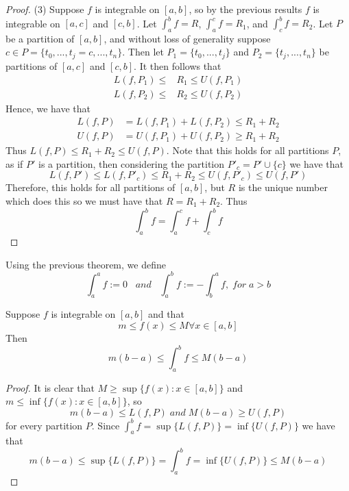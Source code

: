 \begin{proof}
    (3) Suppose $f$ is integrable on $[a,b]$, so by the previous results $f$ is integrable on $[a,c]$ and $[c,b]$. Let $\int_a^bf = R$, $\int_a^cf = R_1$, and $\int_c^bf = R_2$. Let $P$ be a partition of $[a,b]$, and without loss of generality suppose $c \in P = \{t_0,...,t_j = c,...,t_n\}$. Then let $P_1 = \{t_0,...,t_j\}$ and $P_2 = \{t_j,...,t_n\}$ be partitions of $[a,c]$ and $[c,b]$. It then follows that \begin{align*}
        L(f,P_1) \leq &R_1 \leq U(f,P_1) \\
        L(f,P_2) \leq &R_2 \leq U(f,P_2)
    \end{align*}
    Hence, we have that \begin{align*}
        L(f,P) &= L(f,P_1) + L(f,P_2) \leq R_1 + R_2 \\
        U(f,P) &= U(f,P_1) + U(f,P_2) \geq R_1 + R_2
    \end{align*}
    Thus $L(f,P) \leq R_1 + R_2\leq U(f,P)$. Note that this holds for all partitions $P$, as if $P'$ is a partition, then considering the partition $P'_{c} = P' \cup \{c\}$ we have that $$L(f,P') \leq L(f,P'_{c}) \leq R_1 + R_2 \leq U(f,P'_{c}) \leq U(f,P')$$
    Therefore, this holds for all partitions of $[a,b]$, but $R$ is the unique number which does this so we must have that $R = R_1 + R_2$. Thus \begin{equation*}
        \int_a^bf = \int_a^cf + \int_c^bf
    \end{equation*}
\end{proof}


\begin{defn}
    Using the previous theorem, we define \begin{equation}
        \int_a^af := 0 \;\;\;and\;\;\;\int_a^bf := -\int_b^af,\;for\;a>b
    \end{equation}
\end{defn}


\begin{thm}\label{thm:boundint}
    Suppose $f$ is integrable on $[a,b]$ and that \begin{equation}
        m \leq f(x) \leq M \forall x \in [a,b]
    \end{equation}
    Then \begin{equation}
        m(b-a) \leq \int_a^bf \leq M(b-a)
    \end{equation}
\end{thm}
\begin{proof}
    It is clear that $M \geq \sup\{f(x):x \in [a,b]\}$ and $m \leq \inf\{f(x):x\in [a,b]\}$, so \begin{equation*}
        m(b-a) \leq L(f,P)\;and\;M(b-a) \geq U(f,P)
    \end{equation*}
    for every partition $P$. Since $\int_a^bf = \sup\{L(f,P)\} = \inf\{U(f,P)\}$ we have that \begin{equation*}
        m(b-a) \leq \sup\{L(f,P)\} = \int_a^bf = \inf\{U(f,P)\} \leq M(b-a)
    \end{equation*}
\end{proof}

